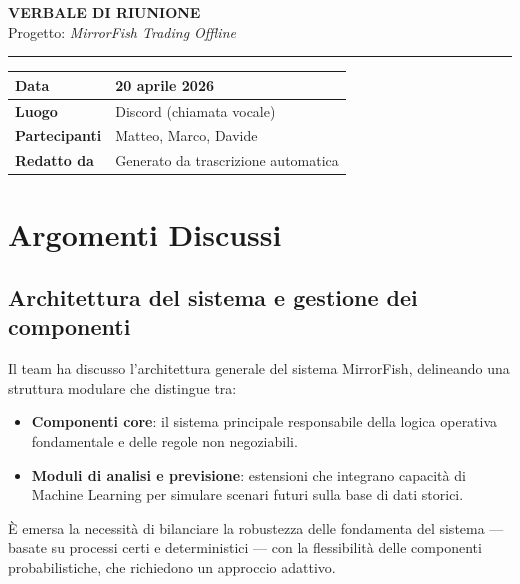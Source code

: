 \documentclass[12pt, a4paper]{article}
\begin{document}
\begin{center}
  {\LARGE\bfseries\color{primary} VERBALE DI RIUNIONE}\\[0.4cm]
  {\large Progetto: \textit{MirrorFish Trading Offline}}\\[0.2cm]
  \textcolor{darkgray}{\rule{0.6\textwidth}{0.4pt}}
\end{center}

\vspace{0.5cm}

\begin{center}
\begin{tabular}{>{\bfseries}p{4cm} p{9cm}}
\toprule
Data & 20 aprile 2026 \\
\midrule
Luogo & Discord (chiamata vocale) \\
\midrule
Partecipanti & Matteo, Marco, Davide \\
\midrule
Redatto da & Generato da trascrizione automatica \\
\bottomrule
\end{tabular}
\end{center}

\vspace{0.8cm}

\section{Argomenti Discussi}

\subsection{Architettura del sistema e gestione dei componenti}

Il team ha discusso l'architettura generale del sistema MirrorFish, delineando una struttura modulare che distingue tra:

\begin{itemize}[leftmargin=1.5cm]
  \item \textbf{Componenti core}: il sistema principale responsabile della logica operativa fondamentale e delle regole non negoziabili.
  \item \textbf{Moduli di analisi e previsione}: estensioni che integrano capacità di Machine Learning per simulare scenari futuri sulla base di dati storici.
\end{itemize}

È emersa la necessità di bilanciare la robustezza delle fondamenta del sistema — basate su processi certi e deterministici — con la flessibilità delle componenti probabilistiche, che richiedono un approccio adattivo.
\end{document}
